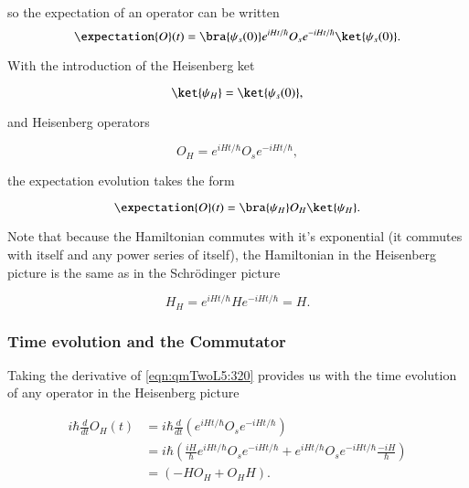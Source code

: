 so the expectation of an operator can be written
\begin{equation}\label{eqn:qmTwoL5:280}
\expectation{O}(t) = 
\bra{\psi_s(0)} 
e^{i H t/\hbar}
O_s
e^{-i H t/\hbar}
\ket{\psi_s(0)}.
\end{equation}

With the introduction of the Heisenberg ket

\begin{equation}\label{eqn:qmTwoL5:300}
\ket{\psi_H} = \ket{\psi_s(0)},
\end{equation}

and Heisenberg operators

\begin{equation}\label{eqn:qmTwoL5:320}
O_H = e^{i H t/\hbar} O_s e^{-i H t/\hbar},
\end{equation}

the expectation evolution takes the form

\begin{equation}\label{eqn:qmTwoL5:340}
\expectation{O}(t) = 
\bra{\psi_H} 
O_H
\ket{\psi_H}.
\end{equation}

Note that because the Hamiltonian commutes with it's exponential (it commutes with itself and any power series of itself), the Hamiltonian in the Heisenberg picture is the same as in the Schr\"{o}dinger picture

\begin{equation}\label{eqn:qmTwoL5:360}
H_H = e^{i H t/\hbar} H e^{-i H t/\hbar} = H.
\end{equation}

\subsubsection{Time evolution and the Commutator}

Taking the derivative of \ref{eqn:qmTwoL5:320} provides us with the time evolution of any operator in the Heisenberg picture

\begin{align*}
i \hbar \frac{d}{dt} O_H(t) 
&=
i \hbar \frac{d}{dt} \left( 
e^{i H t/\hbar} O_s e^{-i H t/\hbar}
\right) \\
&=
i \hbar \left( 
\frac{i H}{\hbar} e^{i H t/\hbar} O_s e^{-i H t/\hbar}
+
e^{i H t/\hbar} O_s e^{-i H t/\hbar} \frac{-i H}{\hbar} 
\right) \\
&=
\left( 
-H O_H
+
O_H H
\right).
\end{align*}

